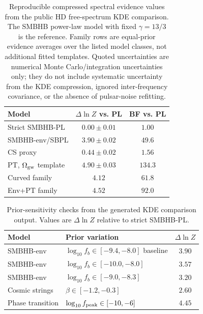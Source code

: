 \documentclass[symmetry,article,submit,pdftex,moreauthors]{Definitions/mdpi}
\begin{document}
\begin{table}[htbp]
    \centering
    \caption{Reproducible compressed spectral evidence values from the public HD free-spectrum KDE comparison. The SMBHB power-law model with fixed $\gamma=13/3$ is the reference. Family rows are equal-prior evidence averages over the listed model classes, not additional fitted templates. Quoted uncertainties are numerical Monte Carlo/integration uncertainties only; they do not include systematic uncertainty from the KDE compression, ignored inter-frequency covariance, or the absence of pulsar-noise refitting.}
    \label{tab:bayesfactors}
    \small
    \begin{tabular}{lcc}
    \toprule
    Model & $\Delta\ln Z$ vs. PL & BF vs. PL \\
    \midrule
    Strict SMBHB-PL & $0.00\pm0.01$ & $1.00$ \\
    SMBHB-env/SBPL & $3.90\pm0.02$ & $49.6$ \\
    CS proxy & $0.44\pm0.02$ & $1.56$ \\
    PT, $\Omega_{\rm gw}$ template & $4.90\pm0.03$ & $134.3$ \\
    \midrule
    Curved family & $4.12$ & $61.8$ \\
    Env+PT family & $4.52$ & $92.0$ \\
    \bottomrule
    \end{tabular}
\end{table}

\begin{table}[htbp]
    \centering
    \caption{Prior-sensitivity checks from the generated KDE comparison output. Values are $\Delta\ln Z$ relative to strict SMBHB-PL.}
    \label{tab:prior-sensitivity}
    \begin{tabular}{l l c}
        \toprule
        Model & Prior variation & $\Delta\ln Z$ \\
        \midrule
        SMBHB-env & $\log_{10}f_b\in[-9.4,-8.0]$ baseline & $3.90$ \\
        SMBHB-env & $\log_{10}f_b\in[-10.0,-8.0]$ & $3.57$ \\
        SMBHB-env & $\log_{10}f_b\in[-9.0,-8.3]$ & $3.20$ \\
        Cosmic strings & $\beta\in[-1.2,-0.3]$ & $2.60$ \\
        Phase transition & $\log_{10}f_{\rm peak}\in[-10,-6]$ & $4.45$ \\
        \bottomrule
    \end{tabular}
\end{table}
\end{document}
